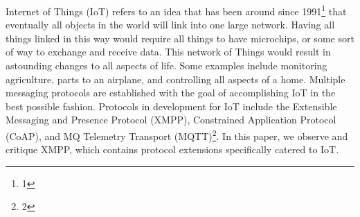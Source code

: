 Internet of Things (IoT) refers to an idea that has been around since
1991\footnote{1} that eventually all objects in the world will link into
one large network. Having all things linked in this way would require all
things to have microchips, or some sort of way to exchange and receive data.
This network of Things would result in astounding changes to all aspects of
life. Some examples include monitoring agriculture, parts to an airplane, and
controlling all aspects of a home. Multiple messaging protocols are
established with the goal of accomplishing IoT in the best possible fashion.
Protocols in development for IoT include the Extensible Messaging and Presence
Protocol (XMPP), Constrained Application Protocol (CoAP), and MQ Telemetry
Transport (MQTT)\footnote{2}. In this paper, we observe and critique XMPP,
which contains protocol extensions specifically catered to IoT.
